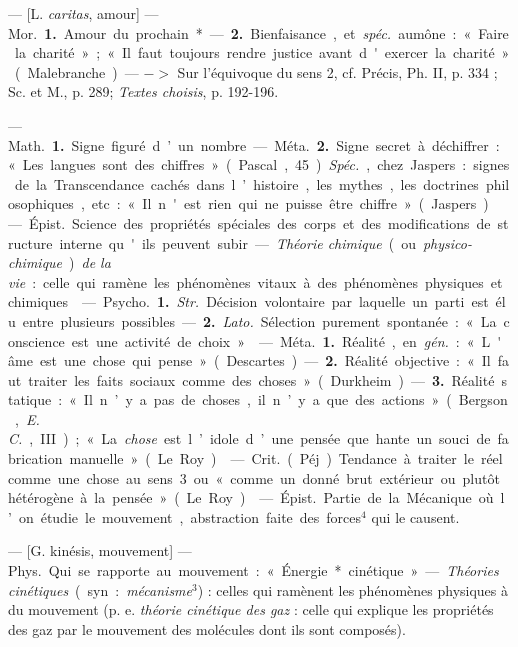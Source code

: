 \begin{itemize}[leftmargin=1cm, label=, itemsep=11pt]
 — [L. {\it caritas}, amour] — \si{Mor.} {\bf 1.}
Amour du prochain*. — {\bf 2.} Bienfaisance, et  {\it spéc.} aumône : « Faire la
charité »; « Il faut toujours rendre
justice avant d'exercer la charité »
(Malebranche). — $->$ Sur l'équivoque du sens 2, cf. Précis, Ph. II,
p. 334 ; Sc. et M., p. 289; {\it Textes
choisis}, p. 192-196.

 — \si{Math.} {\bf 1.} Signe figuré d’un
nombre. — \si{Méta.} {\bf 2.} Signe secret à
déchiffrer : « Les langues sont des
chiffres » (Pascal, 45). {\it Spéc.}, chez
Jaspers : signes de la Transcendance
cachés dans l’histoire, les mythes,
les doctrines philosophiques, etc. :
« Il n'est rien qui ne puisse être
chiffre » (Jaspers).

 — \si{Épist.} Science des propriétés spéciales des corps et des
modifications de structure interne
qu'ils peuvent subir. — {\it Théorie
chimique} (ou {\it physico-chimique}) {\it de
la vie} : celle qui ramène les phénomènes vitaux à des phénomènes
physiques et chimiques.

 — \si{Psycho.} {\bf 1.}  {\it Str.} Décision volontaire par laquelle un parti est élu
entre plusieurs possibles. — {\bf 2.}  {\it Lato.}
Sélection purement spontanée :
« La conscience est une activité de
choix ».

 — \si{Méta.} {\bf 1.} Réalité, en  {\it gén.} :
« L'âme est une chose qui pense »
(Descartes). — {\bf 2.} Réalité objective :
« Il faut traiter les faits sociaux
comme des choses » (Durkheim). —
 {\bf 3.} Réalité statique : « Il n’y a pas
de choses, il n’y a que des actions »
(Bergson, {\it E. C.}, III); « La {\it chose} est
l’idole d’une pensée que hante un
souci de fabrication manuelle »
(Le Roy).

 — \si{Crit.} (Péj.). Tendance à
traiter le réel comme une chose au
sens 3 ou « comme un donné brut
extérieur ou plutôt hétérogène à la
pensée » (Le Roy).

 — \si{Épist.} Partie de la
Mécanique où l’on étudie le mouvement, abstraction faite des forces$^4$
qui le causent.

 — [G. kinésis, mouvement] —
\si{Phys.} Qui se rapporte au mouvement : « Énergie* cinétique ». —
{\it Théories cinétiques} (syn. : {\it mécanisme}$^3$) : celles qui ramènent les
phénomènes physiques à du mouvement (p. e. {\it théorie cinétique des gaz} :
celle qui explique les propriétés des
gaz par le mouvement des molécules
dont ils sont composés).


\end{itemize}
